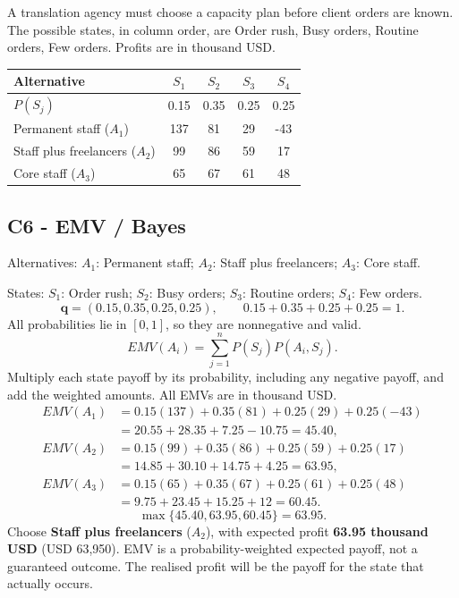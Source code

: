 \clearpage
{}
A translation agency must choose a capacity plan before client orders are known. The possible states, in column order, are Order rush, Busy orders, Routine orders, Few orders. Profits are in thousand USD.
\begin{center}
\begin{tabular}{@{}lcccc@{}}\toprule
Alternative & $S_1$ & $S_2$ & $S_3$ & $S_4$\\\midrule
$P(S_j)$ & 0.15 & 0.35 & 0.25 & 0.25\\
Permanent staff ($A_1$) & 137 & 81 & 29 & -43\\
Staff plus freelancers ($A_2$) & 99 & 86 & 59 & 17\\
Core staff ($A_3$) & 65 & 67 & 61 & 48\\
\bottomrule\end{tabular}
\end{center}
\subsection*{C6 - EMV / Bayes }
\label{sol:translation-capacity-c6}
Alternatives: $A_1$: Permanent staff; $A_2$: Staff plus freelancers; $A_3$: Core staff.\par
States: $S_1$: Order rush; $S_2$: Busy orders; $S_3$: Routine orders; $S_4$: Few orders.
\[\boldsymbol{q}=(0.15,0.35,0.25,0.25),\qquad 0.15+0.35+0.25+0.25=1.\]
All probabilities lie in $[0,1]$, so they are nonnegative and valid.
\[EMV(A_i)=\sum_{j=1}^{n}P(S_j)P(A_i,S_j).\]
Multiply each state payoff by its probability, including any negative payoff, and add the weighted amounts. All EMVs are in thousand USD.
\begin{align*}
EMV(A_1)&=0.15(137)+0.35(81)+0.25(29)+0.25(-43)\\&=20.55+28.35+7.25-10.75=45.40,\\
EMV(A_2)&=0.15(99)+0.35(86)+0.25(59)+0.25(17)\\&=14.85+30.10+14.75+4.25=63.95,\\
EMV(A_3)&=0.15(65)+0.35(67)+0.25(61)+0.25(48)\\&=9.75+23.45+15.25+12=60.45.
\end{align*}
\[\max\{45.40,63.95,60.45\}=63.95.\]
Choose \textbf{Staff plus freelancers} ($A_2$), with expected profit \textbf{63.95 thousand USD} (USD 63,950). EMV is a probability-weighted expected payoff, not a guaranteed outcome. The realised profit will be the payoff for the state that actually occurs.
\par\vspace{4mm}

